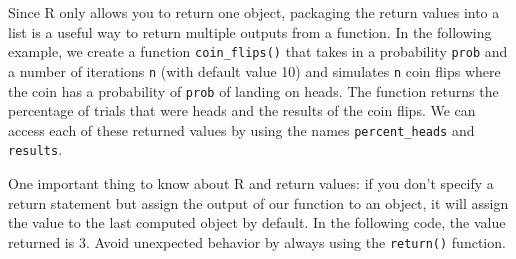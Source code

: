 \documentclass[
  letterpaper,
]{latex/krantz}
\makeatletter
\newenvironment{Shaded}{\begin{snugshade}}{\end{snugshade}}
\newcommand{\AttributeTok}[1]{\textcolor[rgb]{0.40,0.45,0.13}{#1}}
\newcommand{\CommentTok}[1]{\textcolor[rgb]{0.37,0.37,0.37}{#1}}
\newcommand{\ControlFlowTok}[1]{\textcolor[rgb]{0.00,0.23,0.31}{#1}}
\newcommand{\DecValTok}[1]{\textcolor[rgb]{0.68,0.00,0.00}{#1}}
\newcommand{\FloatTok}[1]{\textcolor[rgb]{0.68,0.00,0.00}{#1}}
\newcommand{\FunctionTok}[1]{\textcolor[rgb]{0.28,0.35,0.67}{#1}}
\newcommand{\NormalTok}[1]{\textcolor[rgb]{0.00,0.23,0.31}{#1}}
\newcommand{\OtherTok}[1]{\textcolor[rgb]{0.00,0.23,0.31}{#1}}
\newcommand{\SpecialCharTok}[1]{\textcolor[rgb]{0.37,0.37,0.37}{#1}}
\newenvironment{kframe}{%
\medskip{}
\setlength{\fboxsep}{.8em}
 \def\at@end@of@kframe{}%
 \ifinner\ifhmode%
  \def\at@end@of@kframe{\end{minipage}}%
  \begin{minipage}{\columnwidth}%
 \fi\fi%
 \def\FrameCommand##1{\hskip\@totalleftmargin \hskip-\fboxsep
 \colorbox{shadecolor}{##1}\hskip-\fboxsep
     \hskip-\linewidth \hskip-\@totalleftmargin \hskip\columnwidth}%
 \MakeFramed {\advance\hsize-\width
   \@totalleftmargin\z@ \linewidth\hsize
   \@setminipage}}%
 {\par\unskip\endMakeFramed%
 \at@end@of@kframe}
\renewenvironment{Shaded}{\begin{kframe}}{\end{kframe}}
\makeatother
\begin{document}
\begin{Shaded}
\end{Shaded}

Since R only allows you to return one object, packaging the return
values into a list is a useful way to return multiple outputs from a
function. In the following example, we create a function
\texttt{coin\_flips()} that takes in a probability \texttt{prob} and a
number of iterations \texttt{n} (with default value 10) and simulates
\texttt{n} coin flips where the coin has a probability of \texttt{prob}
of landing on heads. The function returns the percentage of trials that
were heads and the results of the coin flips. We can access each of
these returned values by using the names \texttt{percent\_heads} and
\texttt{results}.

\begin{Shaded}
\end{Shaded}

One important thing to know about R and return values: if you don't
specify a return statement but assign the output of our function to an
object, it will assign the value to the last computed object by default.
In the following code, the value returned is 3. Avoid unexpected
behavior by always using the
\texttt{return()}
function.
\end{document}
